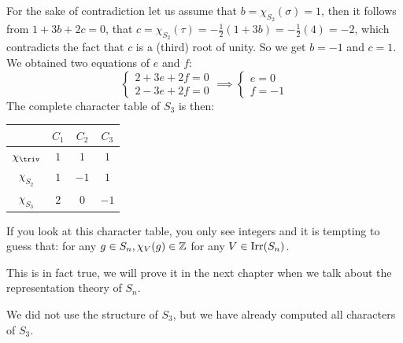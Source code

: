 \documentclass[twoside = false,	%
		headsepline,		%
		parskip = true,
		]{scrbook}						%
\begin{document}
    For the sake of contradiction let us assume that $b = \chi_{S_2}(\sigma) = 1$, then it follows from $1 + 3b + 2c = 0$, that $c = \chi_{S_2}(\tau) = -\frac{1}{2} (1 + 3b) = -\frac{1}{2} (4) = -2$, which contradicts the fact that $c$ is a (third) root of unity. So we get $b = -1$ and $c = 1$.
    We obtained two equations of $e$ and $f$:
    \begin{equation*}
        \left\{ \begin{array}{cc}
             2 + 3e + 2f = 0  \\
             2 - 3e + 2f = 0 
        \end{array}\right. \implies \left\{ \begin{array}{cc}
             e = 0  \\
             f = -1 
        \end{array}\right.
    \end{equation*}
    The complete character table of $S_3$ is then:
    \begin{table}[ht]
        \centering
        \begin{tabular}{|c|c|c|c|}
        \hline
             & $C_1$ & $C_2$ & $C_3$  \\ \hline
            $\chi_{\triv}$ & $1$ & $1$ & $1$  \\ \hline
            $\chi_{S_2}$ & $1$ & $-1$ & $1$ \\ \hline 
            $\chi_{S_3}$ & $2$ & $0$ & $-1$ \\ \hline
        \end{tabular}
    \end{table}

    If you look at this character table, you only see integers and it is tempting to guess that: for any $g \in S_n, \chi_V(g) \in \mathbb Z$ for any $V \in \mathrm{Irr}(S_n)$.

    This is in fact true, we will prove it in the next chapter when we talk about the representation theory of $S_n$.

    We did not use the structure of $S_3$, but we have already computed all characters of $S_3$.
\end{document}

